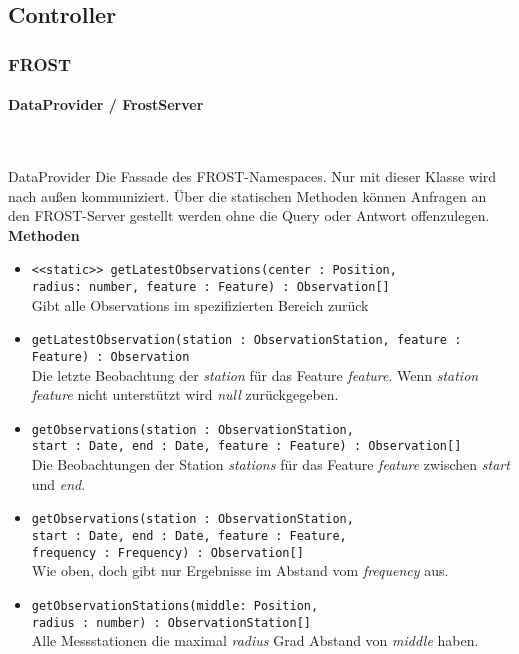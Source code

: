 \subsection{Controller}

\subsubsection{FROST}

\paragraph{DataProvider / FrostServer}\mbox{}\\

\begin{Class}{DataProvider}
    Die Fassade des FROST-Namespaces. Nur mit dieser Klasse wird nach außen kommuniziert.
    Über die statischen Methoden können Anfragen an den FROST-Server gestellt werden ohne die Query oder Antwort offenzulegen.
    \textbf{Methoden}
    \begin{itemize}
        \item \texttt{<<static>> getLatestObservations(center : Position,
        \\ radius: number, feature : Feature) : Observation[]}
        \\Gibt alle Observations im spezifizierten Bereich zurück
        \item \texttt{getLatestObservation(station : ObservationStation, feature : Feature) : Observation}
        \\ Die letzte Beobachtung der \emph{station} für das Feature \emph{feature}.
        Wenn \emph{station} \emph{feature} nicht unterstützt wird \emph{null} zurückgegeben.
        \item \texttt{getObservations(station : ObservationStation,
        \\ start : Date, end : Date, feature : Feature) : Observation[]}
        \\ Die Beobachtungen der Station \emph{stations} für das Feature \emph{feature}
        zwischen \emph{start} und \emph{end}.
        \item \texttt{getObservations(station : ObservationStation,
        \\ start : Date, end : Date, feature : Feature,
        \\ frequency : Frequency) : Observation[]}
        \\ Wie oben, doch gibt nur Ergebnisse im Abstand vom \emph{frequency} aus.
        \item \texttt{getObservationStations(middle: Position,
        \\ radius : number) : ObservationStation[]}
        \\ Alle Messstationen die maximal \emph{radius} Grad Abstand von \emph{middle} haben.
    \end{itemize}
\end{Class}

